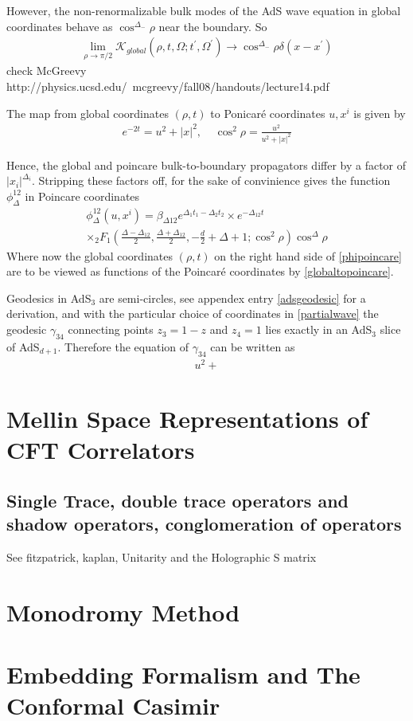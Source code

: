 However, the non-renormalizable bulk modes of the AdS wave equation in global coordinates behave as $\cos^{\Delta_-} \rho$ near the boundary. So 
\begin{align}
 \lim_{\rho \to \pi/2} \mathcal{K}_{global}(\rho,t,\Omega;t^\prime, \Omega^\prime) \to \cos^{\Delta_-}\rho \delta(x-x^\prime)
\end{align}
  check McGreevy http://physics.ucsd.edu/~mcgreevy/fall08/handouts/lecture14.pdf 
  
  The map from global coordinates $(\rho, t)$ to Ponicar\'{e} coordinates $u,x^i$ is given by
  \begin{align}
   e^{-2t} = u^2 + |x|^2, \;\;\;\; \cos^2\rho = \frac{u^2}{u^2 + |x|^2} \label{globaltopoincare}
  \end{align}

  Hence, the global and poincare bulk-to-boundary propagators differ by a factor of $|x_i|^{\Delta_i}$. Stripping these factors off, for the sake of convinience gives the function $\phi^{12}_{\Delta}$ in Poincare coordinates
   \begin{multline}
   \phi^{12}_{\Delta}(u,x^i) = \beta_{\Delta 1 2 } e^{\Delta_1 t_1 - \Delta_2 t_2}\times e^{-\Delta_{12}t} \\ \times {}_2 F_1 \left(\frac{\Delta-\Delta_{12}}{2},\frac{\Delta+\Delta_{12}}{2} ,  -\frac{d}{2}+\Delta +1 ; \cos^2 \rho \right) \cos^\Delta \rho \label{phipoincare}
 \end{multline}
 Where now the global coordinates $(\rho,t)$ on the right hand side of \ref{phipoincare} are to be viewed as functions of the Poincar\'{e} coordinates by \ref{globaltopoincare}. 
 
 Geodesics in AdS$_3$ are semi-circles, see appendex entry \ref{adsgeodesic}  for a derivation, and with the particular choice of coordinates in \ref{partialwave} the geodesic $\gamma_{34}$ connecting points $z_3 = 1-z$ and $z_4 = 1$ lies exactly in an AdS$_3$ slice of AdS$_{d+1}$. Therefore the equation of $\gamma_{34}$ can be written as 
 \begin{align}
  u^2 + 
 \end{align}

  \section{Mellin Space Representations of CFT Correlators}
  \subsection{Single Trace, double trace operators and shadow operators, conglomeration of operators}
  See fitzpatrick, kaplan, Unitarity and the Holographic S matrix
  \section{Monodromy Method}
  \section{Embedding Formalism and The Conformal Casimir}
